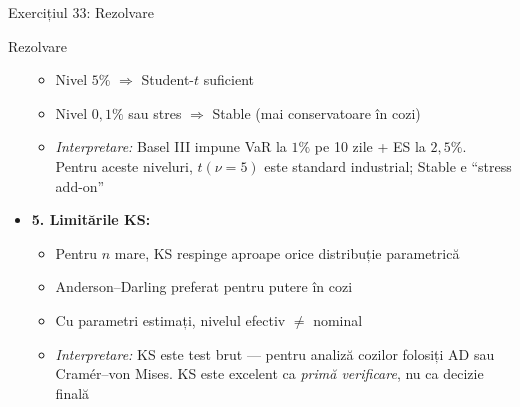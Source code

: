 \documentclass[9pt, aspectratio=169, t]{beamer}
\begin{document}
\begin{frame}[shrink=35]{Exercițiul 33: Rezolvare}
\begin{cminipage}{0.95\textwidth}
\begin{exampleblock}{Rezolvare}
\begin{itemize}
\begin{itemize}
        \item Nivel $5\%$ $\Rightarrow$ Student-$t$ suficient
        \item Nivel $0{,}1\%$ sau stres $\Rightarrow$ Stable (mai conservatoare în cozi)
        \item \textit{Interpretare:} Basel III impune VaR la $1\%$ pe 10 zile + ES la $2{,}5\%$. Pentru aceste niveluri, $t(\nu = 5)$ este standard industrial; Stable e ``stress add-on''
    \end{itemize}
    \item \textbf{5. Limitările KS:}
    \begin{itemize}\setlength{\itemsep}{0pt}
        \item Pentru $n$ mare, KS respinge aproape orice distribuție parametrică
        \item Anderson--Darling preferat pentru putere în cozi
        \item Cu parametri estimați, nivelul efectiv $\ne$ nominal
        \item \textit{Interpretare:} KS este test brut --- pentru analiză cozilor folosiți AD sau Cramér--von Mises. KS este excelent ca \emph{primă verificare}, nu ca decizie finală
    \end{itemize}
\end{itemize}
\end{exampleblock}
\end{cminipage}
\end{frame}
\end{document}
